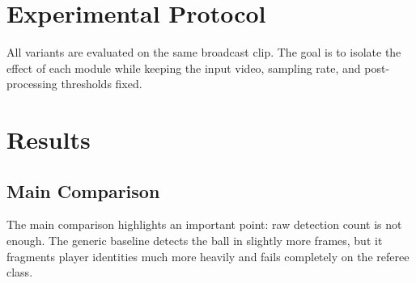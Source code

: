 \documentclass[11pt,a4paper]{article}
\begin{document}
\section{Experimental Protocol}
All variants are evaluated on the same broadcast clip. The goal is to isolate the effect of each module while keeping the input video, sampling rate, and post-processing thresholds fixed.

\begin{table}[H]
\centering
\caption{Configurations compared in the experiments.}
\end{table}

\section{Results}

\subsection{Main Comparison}
The main comparison highlights an important point: raw detection count is not enough. The generic baseline detects the ball in slightly more frames, but it fragments player identities much more heavily and fails completely on the referee class.

\begin{table}[H]
\centering
\caption{Baseline versus full pipeline on the 750-frame evaluation clip.}
\end{table}
\end{document}
